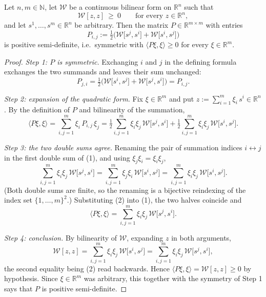 \begin{lemma}
Let $n,m\in\mathbb{N}$, let $\mathcal{W}$ be a continuous bilinear form on $\mathbb{R}^n$ such that
$$\mathcal{W}[z,z]\ \geq\ 0\qquad\text{for every }z\in\mathbb{R}^n,$$
and let $s^1,\dots,s^m\in\mathbb{R}^n$ be arbitrary. Then the matrix
$P\in\mathbb{R}^{m\times m}$ with entries
$$P_{i,j}:=\tfrac12\Big(\mathcal{W}\big[s^j,s^i\big]+\mathcal{W}\big[s^i,s^j\big]\Big)$$
is positive semi-definite, i.e.\ symmetric with $\langle P\xi,\xi\rangle\geq0$ for every
$\xi\in\mathbb{R}^m$.
\end{lemma}
\begin{proof}
\emph{Step 1: $P$ is symmetric.} Exchanging $i$ and $j$ in the defining formula exchanges the two
summands and leaves their sum unchanged:
$$P_{j,i}=\tfrac12\Big(\mathcal{W}\big[s^i,s^j\big]+\mathcal{W}\big[s^j,s^i\big]\Big)=P_{i,j}.$$

\emph{Step 2: expansion of the quadratic form.} Fix $\xi\in\mathbb{R}^m$ and put
$z:=\sum_{i=1}^m\xi_i\,s^i\in\mathbb{R}^n$. By the definition of $P$ and bilinearity of the
summation,
\begin{equation*}\langle P\xi,\xi\rangle=\sum_{i,j=1}^m\xi_i\,P_{i,j}\,\xi_j
=\tfrac12\sum_{i,j=1}^m\xi_i\xi_j\,\mathcal{W}\big[s^j,s^i\big]
+\tfrac12\sum_{i,j=1}^m\xi_i\xi_j\,\mathcal{W}\big[s^i,s^j\big]. \tag{1}\end{equation*}

\emph{Step 3: the two double sums agree.} Renaming the pair of summation indices
$i\leftrightarrow j$ in the first double sum of (1), and using $\xi_j\xi_i=\xi_i\xi_j$,
\begin{equation*}\sum_{i,j=1}^m\xi_i\xi_j\,\mathcal{W}\big[s^j,s^i\big]
=\sum_{i,j=1}^m\xi_j\xi_i\,\mathcal{W}\big[s^i,s^j\big]
=\sum_{i,j=1}^m\xi_i\xi_j\,\mathcal{W}\big[s^i,s^j\big]. \tag{2}\end{equation*}
(Both double sums are finite, so the renaming is a bijective reindexing of the index set
$\{1,\dots,m\}^2$.) Substituting (2) into (1), the two halves coincide and
$$\langle P\xi,\xi\rangle=\sum_{i,j=1}^m\xi_i\xi_j\,\mathcal{W}\big[s^j,s^i\big].$$

\emph{Step 4: conclusion.} By bilinearity of $\mathcal{W}$, expanding $z$ in both arguments,
$$\mathcal{W}[z,z]=\sum_{i,j=1}^m\xi_i\xi_j\,\mathcal{W}\big[s^i,s^j\big]
=\sum_{i,j=1}^m\xi_i\xi_j\,\mathcal{W}\big[s^j,s^i\big],$$
the second equality being (2) read backwards. Hence
$\langle P\xi,\xi\rangle=\mathcal{W}[z,z]\geq0$ by hypothesis. Since $\xi\in\mathbb{R}^m$ was
arbitrary, this together with the symmetry of Step 1 says that $P$ is positive semi-definite.
\end{proof}
